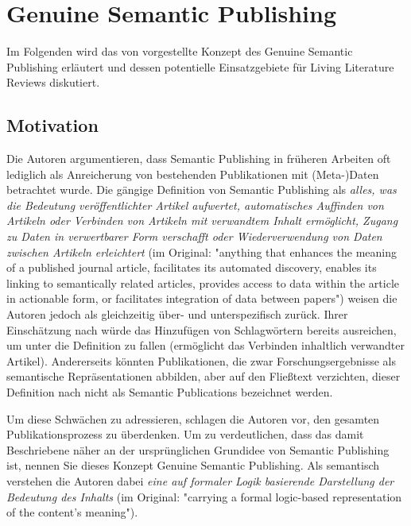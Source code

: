 \section{Genuine Semantic Publishing}
\label{sec:genuine-semantic-publishing}

Im Folgenden wird das von \citet{kuhn2017genuine} vorgestellte Konzept des Genuine Semantic Publishing erläutert und dessen potentielle Einsatzgebiete für Living Literature Reviews diskutiert.

\subsection{Motivation}
\label{subsec:motivation}

Die Autoren argumentieren, dass Semantic Publishing in früheren Arbeiten oft lediglich als Anreicherung von bestehenden Publikationen mit (Meta-)Daten betrachtet wurde.
Die gängige Definition von Semantic Publishing als \textit{alles, was die Bedeutung veröffentlichter Artikel aufwertet, automatisches Auffinden von Artikeln oder Verbinden von Artikeln mit verwandtem Inhalt ermöglicht, Zugang zu Daten in verwertbarer Form verschafft oder Wiederverwendung von Daten zwischen Artikeln erleichtert} (im Original: "anything that enhances the meaning of a published journal article, facilitates its automated discovery, enables its linking to semantically related articles, provides access to data within the article in actionable form, or facilitates integration of data between papers") \cite{kuhn2017genuine} weisen die Autoren jedoch als gleichzeitig über- und unterspezifisch zurück.
Ihrer Einschätzung nach würde das Hinzufügen von Schlagwörtern bereits ausreichen, um unter die Definition zu fallen (ermöglicht das Verbinden inhaltlich verwandter Artikel).
Andererseits könnten Publikationen, die zwar Forschungsergebnisse als semantische Repräsentationen abbilden, aber auf den Fließtext verzichten, dieser Definition nach nicht als Semantic Publications bezeichnet werden.

Um diese Schwächen zu adressieren, schlagen die Autoren vor, den gesamten Publikationsprozess zu überdenken.
Um zu verdeutlichen, dass das damit Beschriebene näher an der ursprünglichen Grundidee von Semantic Publishing ist, nennen Sie dieses Konzept Genuine Semantic Publishing.
Als semantisch verstehen die Autoren dabei \textit{eine auf formaler Logik basierende Darstellung der Bedeutung des Inhalts} (im Original: "carrying a formal logic-based representation of the content's meaning").


